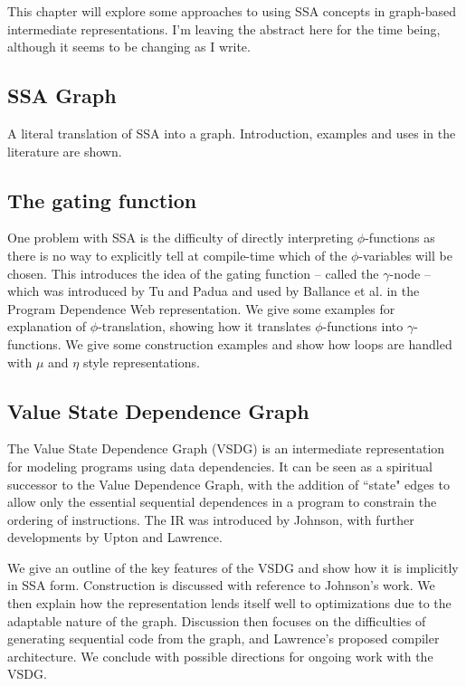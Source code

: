 This chapter will explore some approaches to using SSA concepts in graph-based intermediate representations. I'm leaving the abstract here for the time being, although it seems to be changing as I write.

\subsection*{SSA Graph}

A literal translation of SSA into a graph. Introduction, examples and uses in the literature are shown.

\subsection*{The gating function}

One problem with SSA is the difficulty of directly interpreting $\phi$-functions as there is no way to explicitly tell at compile-time which of the $\phi$-variables will be chosen. This introduces the idea of the gating function -- called the $\gamma$-node -- which was introduced by Tu and Padua \cite{207115} and used by Ballance et al. in the Program Dependence Web\cite{93578} representation. We give some examples for explanation of $\phi$-translation, showing how it translates $\phi$-functions into $\gamma$-functions.
We give some construction examples and show how loops are handled with $\mu$ and $\eta$ style representations.

\subsection*{Value State Dependence Graph}

The Value State Dependence Graph (VSDG) is an intermediate representation for modeling programs using data dependencies. It can be seen as a spiritual successor to the Value Dependence Graph\cite{177907}, with the addition of ``state" edges to allow only the essential sequential dependences in a program to constrain the ordering of instructions. The IR was introduced by Johnson\cite{UCAM-CL-TR-607}, with further developments by Upton\cite{upton} and Lawrence\cite{UCAM-CL-TR-705}.

We give an outline of the key features of the VSDG and show how it is implicitly in SSA form. Construction is discussed with reference to Johnson's work. We then explain how the representation lends itself well to optimizations due to the adaptable nature of the graph. Discussion then focuses on the difficulties of generating sequential code from the graph\cite{DBLP:conf/pdpta/Upton03}, and Lawrence's proposed compiler architecture. We conclude with possible directions for ongoing work with the VSDG.

